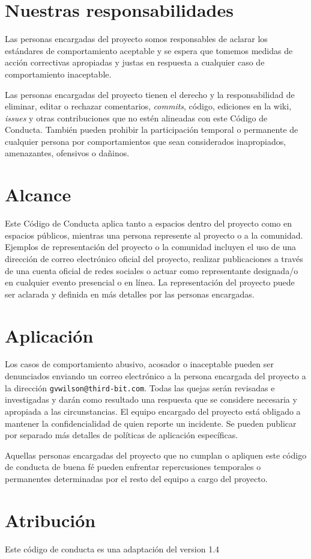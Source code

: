 \section*{Nuestras responsabilidades}

Las personas encargadas del proyecto somos responsables de aclarar los estándares de
comportamiento aceptable y se espera que tomemos medidas de acción correctivas
apropiadas y justas en respuesta a cualquier caso de comportamiento inaceptable.

Las personas encargadas del proyecto tienen el derecho y la responsabilidad de
eliminar, editar o rechazar comentarios, \emph{commits}, código, ediciones en la wiki, \emph{issues} y otras
contribuciones que no estén alineadas con este Código de Conducta. También pueden
prohibir la participación temporal o permanente de cualquier persona por comportamientos
que sean considerados inapropiados, amenazantes, ofensivos o dañinos.

\section*{Alcance}

Este Código de Conducta aplica tanto a espacios dentro del proyecto
como en espacios públicos, mientras una persona represente al proyecto o a
la comunidad. Ejemplos de representación del proyecto o la comunidad incluyen
el uso de una dirección de correo electrónico oficial del proyecto,
realizar publicaciones a través de una cuenta oficial de redes sociales
o actuar como representante designada/o en cualquier evento presencial o en línea.
La representación del proyecto puede ser aclarada y definida en más
detalles por las personas encargadas.

\section*{Aplicación}

Los casos de comportamiento abusivo, acosador o inaceptable
pueden ser denunciados enviando un correo electrónico a la persona encargada del proyecto a la dirección \texttt{gvwilson@third-bit.com}.
Todas las quejas serán revisadas e investigadas y darán como resultado
una respuesta que se considere necesaria y apropiada a las circunstancias.
El equipo encargado del proyecto está obligado a mantener la confidencialidad de quien reporte un incidente.
Se pueden publicar por separado más detalles
de políticas de aplicación específicas.

Aquellas personas encargadas del proyecto que no cumplan o apliquen 
este código de conducta de buena fé pueden enfrentar repercusiones
temporales o permanentes determinadas por el resto del equipo a cargo
del proyecto.

\section*{Atribución}

Este código de conducta es una adaptación del
 version 1.4
